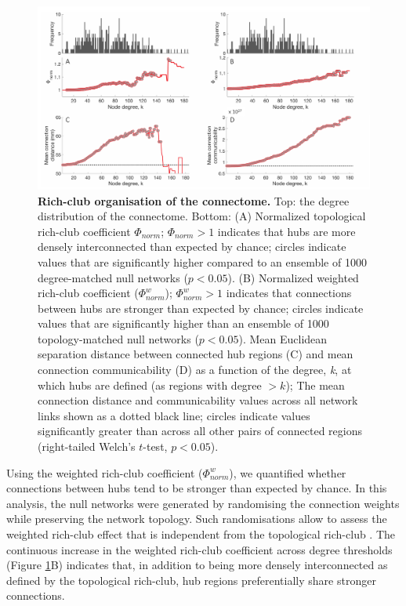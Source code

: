 \begin{figure}[h!]
\begin{center}
\includegraphics[width=1\textwidth]{Chapter5/Ch5Fig3.pdf}%
\end{center}
\caption{\textbf{Rich-club organisation of the connectome.}
Top: the degree distribution of the connectome. Bottom:
(A) Normalized topological rich-club coefficient $\Phi_{norm}$; $\Phi_{norm} >1$ indicates that hubs are more densely interconnected than expected by chance; circles indicate values that are significantly higher compared to an ensemble of 1000 degree-matched null networks ($p < 0.05$).
(B) Normalized weighted rich-club coefficient ($\Phi_{norm}^{w}$); $\Phi_{norm}^{w}>1$ indicates that connections between hubs are stronger than expected by chance; circles indicate values that are significantly higher than an ensemble of 1000 topology-matched null networks ($p < 0.05$). Mean Euclidean separation distance between connected hub regions (C) and mean connection communicability (D) as a function of the degree, \textit{k}, at which hubs are defined (as regions with degree $> k$); The mean connection distance and communicability values across all network links shown as a dotted black line; circles indicate values significantly greater than across all other pairs of connected regions (right-tailed Welch’s $t$-test, $p < 0.05$).}
\label{fig:Ch5Fig3}
\end{figure}

Using the weighted rich-club coefficient ($\Phi_{norm}^{w}$), we quantified whether connections between hubs tend to be stronger than expected by chance. In this analysis, the null networks were generated by randomising the connection weights while preserving the network topology. Such randomisations allow to assess the weighted rich-club effect that is independent from the topological rich-club \citep{Alstott2014}. The continuous increase in the weighted rich-club coefficient across degree thresholds (Figure \ref{fig:Ch5Fig3}B) indicates that, in addition to being more densely interconnected as defined by the topological rich-club, hub regions preferentially share stronger connections.

